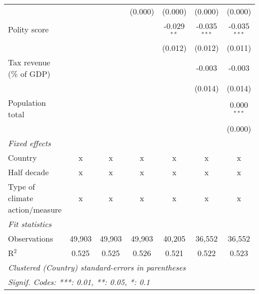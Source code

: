 \begin{tabular}{lcccccc}
                                                                               &               &               & (0.000)        & (0.000)        & (0.000)        & (0.000)\\   
   Polity score                                                                &               &               &                & -0.029$^{**}$  & -0.035$^{***}$ & -0.035$^{***}$\\   
                                                                               &               &               &                & (0.012)        & (0.012)        & (0.011)\\   
   Tax revenue (\% of GDP)                                                     &               &               &                &                & -0.003         & -0.003\\   
                                                                               &               &               &                &                & (0.014)        & (0.014)\\   
   Population total                                                            &               &               &                &                &                & 0.000$^{***}$\\   
                                                                               &               &               &                &                &                & (0.000)\\   
   \emph{Fixed effects}\\
   Country                                                                     & x             & x             & x              & x              & x              & x\\  
   Half decade                                                                 & x             & x             & x              & x              & x              & x\\  
   Type of climate action/measure                                              & x             & x             & x              & x              & x              & x\\  
   \midrule \emph{Fit statistics}\\
   Observations                                                                & 49,903        & 49,903        & 49,903         & 40,205         & 36,552         & 36,552\\  
   R$^2$                                                                       & 0.525         & 0.525         & 0.526          & 0.521          & 0.522          & 0.523\\  
   \midrule
   \multicolumn{7}{l}{\emph{Clustered (Country) standard-errors in parentheses}}\\
   \multicolumn{7}{l}{\emph{Signif. Codes: ***: 0.01, **: 0.05, *: 0.1}}\\
\end{tabular}
\par\endgroup



